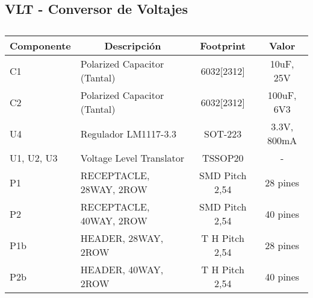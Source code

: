\subsection{VLT - Conversor de Voltajes}
\begin{table}[htbp]
\begin{center}
\begin{tabular}{|l|l|c|c|}
\hline
\multicolumn{1}{|c|}{\textbf{Componente}} & \multicolumn{1}{c|}{\textbf{Descripción}} & \textbf{ Footprint} & \textbf{Valor} \\ \hline
C1 & Polarized Capacitor (Tantal) & 6032[2312] & 10uF, 25V \\ \hline
C2 & Polarized Capacitor (Tantal) & 6032[2312] & 100uF, 6V3 \\ \hline
U4 & Regulador LM1117-3.3 & SOT-223 & 3.3V, 800mA \\ \hline
U1, U2, U3 & Voltage Level Translator & TSSOP20 & - \\ \hline
P1 & RECEPTACLE, 28WAY, 2ROW & SMD  Pitch 2,54 & 28 pines \\ \hline
P2 & RECEPTACLE, 40WAY, 2ROW & SMD  Pitch 2,54 & 40 pines \\ \hline
P1b & HEADER, 28WAY, 2ROW & T H Pitch 2,54 & 28 pines \\ \hline
P2b & HEADER, 40WAY, 2ROW & T H Pitch 2,54 & 40 pines \\ \hline
\end{tabular}
\end{center}
\caption{}
\label{}
\end{table}

  

